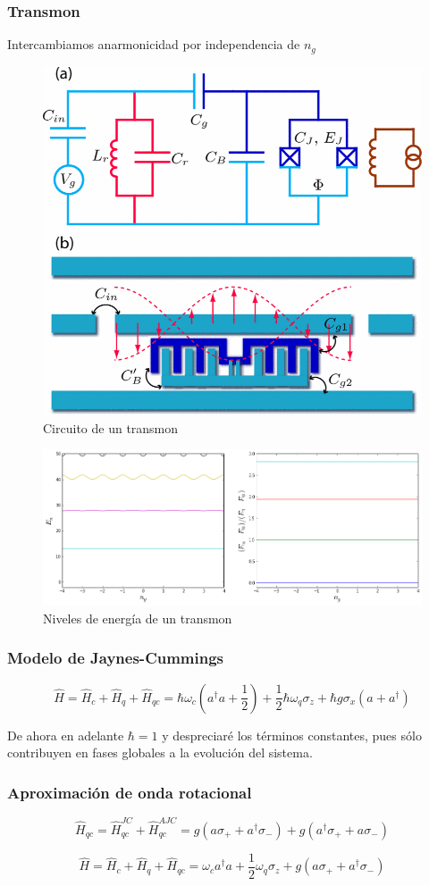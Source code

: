 \documentclass[xetex,mathserif,serif]{beamer}
\begin{document}
\begin{frame}
    \frametitle{Transmon}

Intercambiamos anarmonicidad por independencia de $n_g$

\begin{figure}[H]
\centering \includegraphics[width=0.3\linewidth]{md/Avance1/transmon.png}
\caption{Circuito de un transmon}
\label{fig:transmoncircuit}
\end{figure}

\begin{figure}[H]
\centering \includegraphics[width=0.3\linewidth]{md/Avance1/transmonenergy.png}
\caption{Niveles de energía de un transmon}
\label{fig:transmonenergy}
\end{figure}

\end{frame}

\begin{frame}
    \frametitle{Modelo de Jaynes-Cummings}

$$\hat{H} = \hat{H}_c + \hat{H}_q + \hat{H}_{qc} = \hbar \omega_c (a^\dag a + 
  \frac{1}{2}) + \frac{1}{2} \hbar \omega_q \sigma_z + \hbar g \sigma_x (a+a^\dag)$$

\justify
De ahora en adelante $\hbar = 1$ y despreciaré los términos constantes, pues 
sólo contribuyen en fases globales a la evolución del sistema.

\end{frame}

\begin{frame}
    \frametitle{Aproximación de onda rotacional}

$$\hat{H}_{qc} = \hat{H}_{qc}^{JC} + \hat{H}_{qc}^{AJC} = g(a \sigma_+ + 
  a^\dag\sigma_-) + g(a^\dag \sigma_+ + a \sigma_-)$$

$$\hat{H} = \hat{H}_c + \hat{H}_q + \hat{H}_{qc} = \omega_c a^\dag a +
  \frac{1}{2} \omega_q \sigma_z + g(a \sigma_+ + a^\dag \sigma_-)$$

  \end{frame}
  
\end{document}

